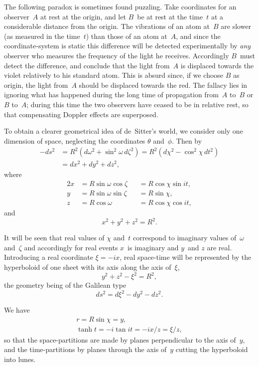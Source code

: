 \documentclass[12pt]{book}
\begin{document}
The following paradox is sometimes found puzzling. Take coordinates for
an observer~$A$ at rest at the origin, and let $B$~be at rest at the time~$t$ at a
considerable distance from the origin. The vibrations of an atom at~$B$ are
slower (as measured in the time~$t$) than those of an atom at~$A$, and since the
coordinate-system is static this difference will be detected experimentally by
\emph{any} observer who measures the frequency of the light he receives. Accordingly
$B$~must detect the difference, and conclude that the light from~$A$ is displaced
towards the violet relatively to his standard atom. This is absurd since, if we
choose $B$ as origin, the light from~$A$ should be displaced towards the red. The
fallacy lies in ignoring what has happened during the long time of propagation
from~$A$ to~$B$ or $B$ to~$A$; during this time the two observers have ceased
to be in relative rest, so that compensating Doppler effects are superposed.

To obtain a clearer geometrical idea of de~Sitter's world, we consider only
one dimension of space, neglecting the coordinates $\theta$ and~$\phi$. Then by~
\begin{align*}
  -ds^{2} &= R^{2} (d\omega^{2} + \sin^{2}\omega\, d\zeta^{2})
  = R^{2} (d\chi^{2} - \cos^{2}\chi\, dt^{2}) \\
  &= dx^{2} + dy^{2} + dz^{2},
\end{align*}
where
\begin{alignat*}{2}
  x &= R\sin\omega \cos\zeta &&= R\cos\chi \sin it, \\
  y &= R\sin\omega \sin\zeta &&= R\sin\chi, \\
  z &= R\cos\omega &&= R\cos\chi \cos it,
\end{alignat*}
and
\[
x^{2} + y^{2} + z^{2} = R^{2}.
\]

It will be seen that real values of $\chi$ and~$t$ correspond to imaginary
values of~$\omega$ and~$\zeta$ and accordingly for real events $x$~is imaginary and $y$~and
$z$ are real. Introducing a real coordinate $\xi = -ix$, real space-time will be
represented by the hyperboloid of one sheet with its axis along the axis of~$\xi$,
\[
y^{2} + z^{2} - \xi^{2} = R^{2},
\]
the geometry being of the Galilean type
\[
ds^{2} = d\xi^{2} - dy^{2} - dz^{2}.
\]

We have
\begin{gather*}
  r = R\sin\chi = y, \\
  \tanh t = -i\tan it = -ix/z = \xi/z,
\end{gather*}
so that the space-partitions are made by planes perpendicular to the axis of~$y$,
and the time-partitions by planes through the axis of~$y$ cutting the hyperboloid
into lunes.
\end{document}
